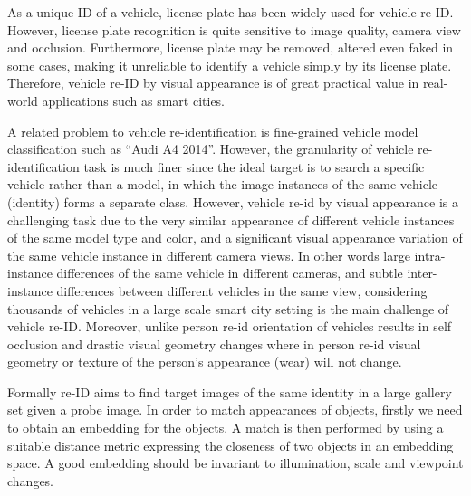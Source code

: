 \documentclass[10pt,twocolumn,letterpaper]{article}
\begin{document}
As a unique ID of a vehicle, license plate has been widely used for vehicle
re-ID. However, license plate recognition is quite sensitive to image quality,
camera view and occlusion. Furthermore, license plate may be removed,
altered even faked in some cases, making it unreliable to identify a vehicle
simply by its license plate. Therefore, vehicle re-ID by visual appearance is
of great practical value in real-world applications such as smart cities.

A related problem to vehicle re-identification is fine-grained vehicle model
classification such as ``Audi A4 2014''\cite{yang2015compcars}.
However, the granularity of vehicle re-identification task is much finer
since the ideal target is to search a specific vehicle rather than a model, in
which the image instances of the same vehicle (identity) forms a separate
class.
However,
vehicle re-id by visual appearance is a
challenging task due to the very similar appearance of different vehicle instances
of the same model type and color, and a significant visual appearance variation
of the same vehicle instance in different camera views. In other words
large intra-instance differences of the same vehicle in different cameras,
and subtle inter-instance differences between different vehicles in the same
view, considering thousands of vehicles in a large scale smart city setting is
the main challenge of vehicle re-ID. Moreover, unlike person re-id
orientation of vehicles results in self occlusion and drastic visual geometry
changes where in person re-id visual geometry or texture of the person's
appearance (wear) will not change.





Formally re-ID  aims to find
target images of the same identity in a large gallery set given a probe image.
In order to match appearances of objects, firstly we need to obtain an
embedding for the objects. A
match is then performed by using a suitable distance metric expressing the
closeness of two objects in an embedding space. A good embedding should be
invariant to illumination, scale and viewpoint changes.
\end{document}
